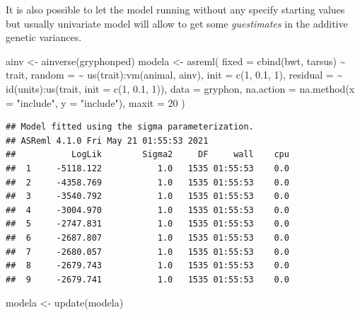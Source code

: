 \documentclass[
  12pt,
]{book}
\newenvironment{Shaded}{\begin{snugshade}}{\end{snugshade}}
\newcommand{\AttributeTok}[1]{\textcolor[rgb]{0.77,0.63,0.00}{#1}}
\newcommand{\DecValTok}[1]{\textcolor[rgb]{0.00,0.00,0.81}{#1}}
\newcommand{\FloatTok}[1]{\textcolor[rgb]{0.00,0.00,0.81}{#1}}
\newcommand{\FunctionTok}[1]{\textcolor[rgb]{0.00,0.00,0.00}{#1}}
\newcommand{\NormalTok}[1]{#1}
\newcommand{\OtherTok}[1]{\textcolor[rgb]{0.56,0.35,0.01}{#1}}
\newcommand{\SpecialCharTok}[1]{\textcolor[rgb]{0.00,0.00,0.00}{#1}}
\newcommand{\StringTok}[1]{\textcolor[rgb]{0.31,0.60,0.02}{#1}}
\begin{document}
It is also possible to let the model running without any specify starting values but usually univariate model will allow to get some \emph{guestimates} in the additive genetic variances.

\begin{Shaded}
\begin{Highlighting}[]
\NormalTok{ainv }\OtherTok{\textless{}{-}} \FunctionTok{ainverse}\NormalTok{(gryphonped)}
\NormalTok{modela }\OtherTok{\textless{}{-}} \FunctionTok{asreml}\NormalTok{(}
  \AttributeTok{fixed =} \FunctionTok{cbind}\NormalTok{(bwt, tarsus) }\SpecialCharTok{\textasciitilde{}}\NormalTok{ trait,}
  \AttributeTok{random =} \SpecialCharTok{\textasciitilde{}} \FunctionTok{us}\NormalTok{(trait)}\SpecialCharTok{:}\FunctionTok{vm}\NormalTok{(animal, ainv), }\AttributeTok{init =} \FunctionTok{c}\NormalTok{(}\DecValTok{1}\NormalTok{, }\FloatTok{0.1}\NormalTok{, }\DecValTok{1}\NormalTok{),}
  \AttributeTok{residual =} \SpecialCharTok{\textasciitilde{}} \FunctionTok{id}\NormalTok{(units)}\SpecialCharTok{:}\FunctionTok{us}\NormalTok{(trait, }\AttributeTok{init =} \FunctionTok{c}\NormalTok{(}\DecValTok{1}\NormalTok{, }\FloatTok{0.1}\NormalTok{, }\DecValTok{1}\NormalTok{)),}
  \AttributeTok{data =}\NormalTok{ gryphon,}
  \AttributeTok{na.action =} \FunctionTok{na.method}\NormalTok{(}\AttributeTok{x =} \StringTok{"include"}\NormalTok{, }\AttributeTok{y =} \StringTok{"include"}\NormalTok{),}
  \AttributeTok{maxit =} \DecValTok{20}
\NormalTok{)}
\end{Highlighting}
\end{Shaded}

\begin{verbatim}
## Model fitted using the sigma parameterization.
## ASReml 4.1.0 Fri May 21 01:55:53 2021
##           LogLik        Sigma2     DF     wall    cpu
##  1     -5118.122           1.0   1535 01:55:53    0.0
##  2     -4358.769           1.0   1535 01:55:53    0.0
##  3     -3540.792           1.0   1535 01:55:53    0.0
##  4     -3004.970           1.0   1535 01:55:53    0.0
##  5     -2747.831           1.0   1535 01:55:53    0.0
##  6     -2687.807           1.0   1535 01:55:53    0.0
##  7     -2680.057           1.0   1535 01:55:53    0.0
##  8     -2679.743           1.0   1535 01:55:53    0.0
##  9     -2679.741           1.0   1535 01:55:53    0.0
\end{verbatim}

\begin{Shaded}
\begin{Highlighting}[]
\NormalTok{modela }\OtherTok{\textless{}{-}} \FunctionTok{update}\NormalTok{(modela)}
\end{Highlighting}
\end{Shaded}
\end{document}
